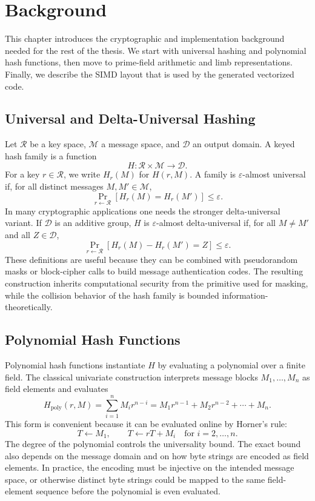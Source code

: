 \chapter{Background}
\label{ch:background}

This chapter introduces the cryptographic and implementation background needed for the rest of the thesis. We start with universal hashing and polynomial hash functions, then move to prime-field arithmetic and limb representations. Finally, we describe the SIMD layout that is used by the generated vectorized code.

\section{Universal and Delta-Universal Hashing}
\label{sec:universal-hashing}

Let \(\mathcal{R}\) be a key space, \(\mathcal{M}\) a message space, and \(\mathcal{D}\) an output domain. A keyed hash family is a function
\[
    H : \mathcal{R} \times \mathcal{M} \rightarrow \mathcal{D}.
\]
For a key \(r \in \mathcal{R}\), we write \(H_r(M)\) for \(H(r,M)\). A family is \(\varepsilon\)-almost universal if, for all distinct messages \(M,M' \in \mathcal{M}\),
\[
    \Pr_{r \leftarrow \mathcal{R}}\left[H_r(M) = H_r(M')\right] \leq \varepsilon.
\]
In many cryptographic applications one needs the stronger delta-universal variant. If \(\mathcal{D}\) is an additive group, \(H\) is \(\varepsilon\)-almost delta-universal if, for all \(M \neq M'\) and all \(Z \in \mathcal{D}\),
\[
    \Pr_{r \leftarrow \mathcal{R}}\left[H_r(M) - H_r(M') = Z\right] \leq \varepsilon.
\]
These definitions are useful because they can be combined with pseudorandom masks or block-cipher calls to build message authentication codes. The resulting construction inherits computational security from the primitive used for masking, while the collision behavior of the hash family is bounded information-theoretically.

\section{Polynomial Hash Functions}
\label{sec:polynomial-hash-functions}

Polynomial hash functions instantiate \(H\) by evaluating a polynomial over a finite field. The classical univariate construction interprets message blocks \(M_1,\ldots,M_n\) as field elements and evaluates
\[
    H_{\mathrm{poly}}(r,M)
        = \sum_{i=1}^{n} M_i r^{n-i}
        = M_1 r^{n-1} + M_2 r^{n-2} + \cdots + M_n.
\]
This form is convenient because it can be evaluated online by Horner's rule:
\[
    T \leftarrow M_1,\qquad
    T \leftarrow rT + M_i \quad \text{for } i=2,\ldots,n.
\]
The degree of the polynomial controls the universality bound. The exact bound also depends on the message domain and on how byte strings are encoded as field elements. In practice, the encoding must be injective on the intended message space, or otherwise distinct byte strings could be mapped to the same field-element sequence before the polynomial is even evaluated.

